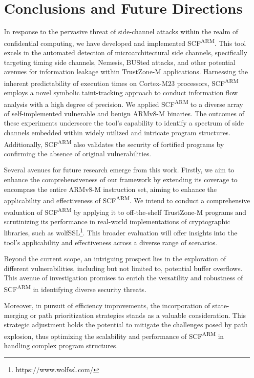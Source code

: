 \section{Conclusions and Future Directions}

In response to the pervasive threat of side-channel attacks within the realm of confidential computing, we have developed and implemented \ac{SCF}\textsuperscript{ARM}. This tool excels in the automated detection of microarchitectural side channels, specifically targeting timing side channels, Nemesis, BUSted attacks, and other potential avenues for information leakage within TrustZone-M applications. Harnessing the inherent predictability of execution times on Cortex-M23 processors, \ac{SCF}\textsuperscript{ARM} employs a novel symbolic taint-tracking approach to conduct information flow analysis with a high degree of precision. We applied \ac{SCF}\textsuperscript{ARM} to a diverse array of self-implemented vulnerable and benign ARMv8-M binaries. The outcomes of these experiments underscore the tool's capability to identify a spectrum of side channels embedded within widely utilized and intricate program structures. Additionally, \ac{SCF}\textsuperscript{ARM} also validates the security of fortified programs by confirming the absence of original vulnerabilities.

Several avenues for future research emerge from this work. Firstly, we aim to enhance the comprehensiveness of our framework by extending its coverage to encompass the entire ARMv8-M instruction set, aiming to enhance the applicability and effectiveness of \ac{SCF}\textsuperscript{ARM}. We intend to conduct a comprehensive evaluation of \ac{SCF}\textsuperscript{ARM} by applying it to off-the-shelf TrustZone-M programs and scrutinizing its performance in real-world implementations of cryptographic libraries, such as wolfSSL\footnote{https://www.wolfssl.com/}. This broader evaluation will offer insights into the tool's applicability and effectiveness across a diverse range of scenarios.

Beyond the current scope, an intriguing prospect lies in the exploration of different vulnerabilities, including but not limited to, potential buffer overflows. This avenue of investigation promises to enrich the versatility and robustness of \ac{SCF}\textsuperscript{ARM} in identifying diverse security threats.

Moreover, in pursuit of efficiency improvements, the incorporation of state-merging \cite{kuznetsov2012efficient} or path prioritization strategies \cite{baldoni2018survey, li2013steering} stands as a valuable consideration. This strategic adjustment holds the potential to mitigate the challenges posed by path explosion, thus optimizing the scalability and performance of \ac{SCF}\textsuperscript{ARM} in handling complex program structures.


